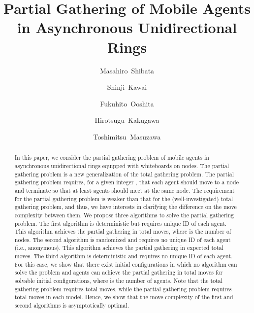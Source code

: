 \documentclass[preprint,12pt]{elsarticle}
\begin{document}
\begin{frontmatter}



\title{Partial Gathering of Mobile Agents \\in Asynchronous Unidirectional Rings}






\author{Masahiro~Shibata}
\author{Shinji~Kawai}

\author{Fukuhito~Ooshita}
\author{Hirotsugu~Kakugawa}
\author{Toshimitsu~Masuzawa}





\address{Graduate School of Information Science and Technology, Osaka University, 1-5
Yamadaoka, Suita, Osaka 565-0871, Japan}

\begin{abstract}
In this paper, we consider the partial gathering problem of mobile agents in
asynchronous unidirectional rings equipped with whiteboards on nodes.
The partial gathering problem is a new generalization of the total gathering problem.
The partial gathering problem requires, for a given integer  , that each agent
should move to a node and terminate so that at least  agents
should meet at the same node. 
The requirement for the partial gathering problem is weaker than that for
the (well-investigated) total gathering problem, and thus, we have interests in
clarifying the difference on the move complexity between them.
We propose three  algorithms to solve the partial gathering problem. 
The first algorithm is deterministic but requires unique ID of each agent. 
This algorithm achieves the partial gathering in  total moves, 
where  is the number of nodes. 
The second algorithm is randomized and requires no unique ID of each agent (i.e., anonymous).
This algorithm achieves the partial gathering in expected   total moves. 
The third  algorithm is deterministic and requires no unique ID of each agent.
For this case, we show that there exist initial configurations in which no algorithm can solve the problem 
and  agents can achieve the partial gathering in  total moves for solvable initial configurations,
where  is the number of agents.
Note that the total gathering problem requires  total moves, while the partial gathering problem requires  total moves in each model.
Hence, we show that the move complexity
of the first and second  algorithms is asymptotically optimal.



\end{abstract}
\end{frontmatter}
\end{document}
